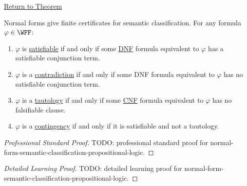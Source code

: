 \newpage
{}
\label{prf:normal-form-semantic-classification-propositional-logic}

\begin{remark*}[Return]
\hyperref[thm:normal-form-semantic-classification-propositional-logic]{Return to Theorem}
\end{remark*}

\begin{theorem*}
Normal forms give finite certificates for semantic classification. For any
formula \(\varphi\in\WFF\):
\begin{enumerate}
  \item \(\varphi\) is
  \hyperref[def:satisfiable-formula-propositional-logic]{satisfiable} if and
  only if some
  \hyperref[def:disjunctive-normal-form-propositional-logic]{DNF} formula
  equivalent to \(\varphi\) has a satisfiable conjunction term.
  \item \(\varphi\) is a
  \hyperref[def:contradiction-propositional-logic]{contradiction} if and only
  if some DNF formula equivalent to \(\varphi\) has no satisfiable conjunction
  term.
  \item \(\varphi\) is a
  \hyperref[def:tautology-propositional-logic]{tautology} if and only if some
  \hyperref[def:conjunctive-normal-form-propositional-logic]{CNF} formula
  equivalent to \(\varphi\) has no falsifiable clause.
  \item \(\varphi\) is a
  \hyperref[def:contingency-propositional-logic]{contingency} if and only if it
  is satisfiable and not a tautology.
\end{enumerate}
\end{theorem*}

\begin{proof}[Professional Standard Proof]
\LRAProofBodyStart
TODO: professional standard proof for normal-form-semantic-classification-propositional-logic.
\end{proof}

\begin{proof}[Detailed Learning Proof]
\LRAProofBodyStart
TODO: detailed learning proof for normal-form-semantic-classification-propositional-logic.
\end{proof}

\begin{remark*}
\end{remark*}

